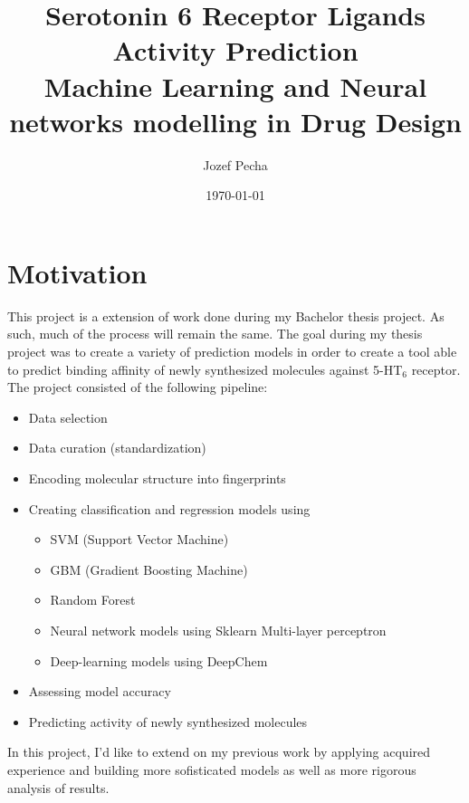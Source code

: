 \documentclass[12pt, twoside]{report}
\title{Serotonin 6 Receptor Ligands Activity Prediction \\
        \large Machine Learning and Neural networks modelling in Drug Design}
\author{Jozef Pecha}
\date{\today}
\begin{document}
\maketitle

\tableofcontents

\chapter{Motivation}

This project is a extension of work done during my Bachelor thesis project. As such, much of the process will remain the same.
The goal during my thesis project was to create a variety of prediction models in order to create a tool able to predict binding affinity
of newly synthesized molecules against 5-HT$_{6}$ receptor. The project consisted of the following pipeline:

        \begin{itemize}
                \item Data selection
                \item Data curation (standardization)
                \item Encoding molecular structure into fingerprints
                \item Creating classification and regression models using
                        \begin{itemize}
                                \item SVM (Support Vector Machine)
                                \item GBM (Gradient Boosting Machine)
                                \item Random Forest
                                \item Neural network models using Sklearn Multi-layer perceptron
                                \item Deep-learning models using DeepChem
                        \end{itemize}
                \item Assessing model accuracy
                \item Predicting activity of newly synthesized molecules
        \end{itemize}

In this project, I'd like to extend on my previous work by applying acquired experience and building more sofisticated models as well as more rigorous analysis of results.
\end{document}
